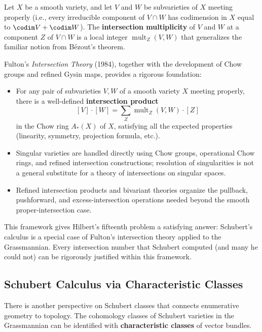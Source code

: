 \begin{definition}
Let $X$ be a smooth variety, and let $V$ and $W$ be subvarieties of $X$ meeting properly (i.e., every irreducible component of $V \cap W$ has codimension in $X$ equal to $\codim V + \codim W$). The \textbf{intersection multiplicity} of $V$ and $W$ at a component $Z$ of $V \cap W$ is a local integer $\operatorname{mult}_Z(V, W)$ that generalizes the familiar notion from Bézout's theorem.
\end{definition}

Fulton's \emph{Intersection Theory} (1984), together with the development of Chow groups and refined Gysin maps, provides a rigorous foundation:

\begin{itemize}
    \item For any pair of subvarieties $V, W$ of a smooth variety $X$ meeting properly, there is a well-defined \textbf{intersection product}
    \[
        [V] \cdot [W] = \sum_Z \operatorname{mult}_Z(V, W) \cdot [Z]
    \]
    in the Chow ring $A_*(X)$ of $X$, satisfying all the expected properties (linearity, symmetry, projection formula, etc.).

    \item Singular varieties are handled directly using Chow groups, operational Chow rings, and refined intersection constructions; resolution of singularities is not a general substitute for a theory of intersections on singular spaces.

    \item Refined intersection products and bivariant theories organize the pullback, pushforward, and excess-intersection operations needed beyond the smooth proper-intersection case.
\end{itemize}

This framework gives Hilbert's fifteenth problem a satisfying answer: Schubert's calculus is a special case of Fulton's intersection theory applied to the Grassmannian. Every intersection number that Schubert computed (and many he could not) can be rigorously justified within this framework.

\subsection{Schubert Calculus via Characteristic Classes}

There is another perspective on Schubert classes that connects enumerative geometry to topology. The cohomology classes of Schubert varieties in the Grassmannian can be identified with \textbf{characteristic classes} of vector bundles.

